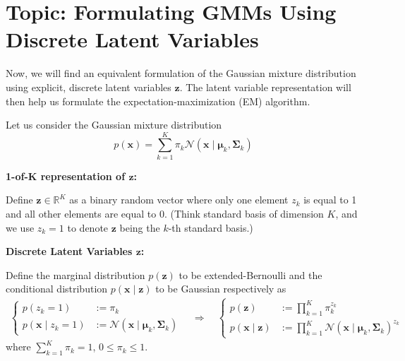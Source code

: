 \documentclass[11pt]{article}
\theoremstyle{plain} %
\newenvironment{topic}
{\color{C2}\normalfont\begin{framed}\begingroup }
  {\endgroup\end{framed}}
\theoremstyle{remark}
\begin{document}
\section{Topic: Formulating GMMs Using Discrete Latent Variables}
Now, we will find an equivalent formulation of the Gaussian mixture distribution
using explicit, discrete latent variables $\mathbf{z}$. The latent variable representation
will then help us formulate the expectation-maximization (EM) algorithm.

Let us consider the Gaussian mixture distribution
$$
  p(\mathbf{x})=\sum_{k=1}^{K} \pi_{k} \mathcal{N}\left(\mathbf{x} \mid \boldsymbol{\mu}_{k}, \boldsymbol{\Sigma}_{k}\right)
$$

\begin{topic}
\textbf{1-of-K representation of $\mathbf{z}$:}

Define $\mathbf{z} \in \mathbb{R}^{K}$ as a binary random vector where only one
element $z_{k}$ is equal to 1 and all other elements are equal to $0$. (Think
standard basis of dimension $K$, and we use $z_k=1$ to denote $\mathbf{z}$ being the $k$-th standard basis.)

\textbf{Discrete Latent Variables $\mathbf{z}$:}

Define the marginal distribution
$p(\mathbf{z})$ to be extended-Bernoulli and the conditional distribution $p(\mathbf{x} \mid \mathbf{z})$ to
be Gaussian respectively as
\begin{align}
  \begin{cases}
    p\left(z_{k}=1\right)                 & := \pi_{k}                                                                               \\
    p\left(\mathbf{x} \mid z_{k}=1\right) & := \mathcal{N}\left(\mathbf{x} \mid \boldsymbol{\mu}_{k}, \boldsymbol{\Sigma}_{k}\right)
  \end{cases}
  \quad \Longrightarrow \quad
  \begin{cases}
    p(\mathbf{z})                 & := \prod_{k=1}^{K} \pi_{k}^{z_{k}}                                                                               \\
    p(\mathbf{x} \mid \mathbf{z}) & := \prod_{k=1}^{K} \mathcal{N}\left(\mathbf{x} \mid \boldsymbol{\mu}_{k}, \boldsymbol{\Sigma}_{k}\right)^{z_{k}}
  \end{cases}
  \label{eq: latent variables}
\end{align}
where $\sum_{k=1}^{K} \pi_{k}=1$, $0 \leqslant \pi_{k} \leqslant 1$.


\end{topic}
\end{document}
